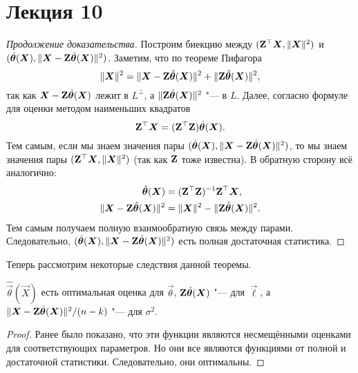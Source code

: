 
\section{Лекция 10}
\begin{proof}[Продолжение доказательства]
	Построим биекцию между $(\mathbf{Z}^{\top}\bm{X}, \|\bm{X}\|^{2})$ и $(\hat{\bm{\theta}}(\bm{X}), \|\bm{X} - \mathbf{Z}\hat{\bm{\theta}}(\bm{X})\|^{2})$. Заметим, что по теореме Пифагора
	\[
		\|\bm{X}\|^{2} = \|\bm{X} - \mathbf{Z}\hat{\bm{\theta}}(\bm{X})\|^{2} + \|\mathbf{Z}\hat{\bm{\theta}}(\bm{X})\|^{2},
	\]
	так как $\bm{X} - \mathbf{Z}\hat{\bm{\theta}}(\bm{X})$ лежит в $L^{\perp}$, а $\|\mathbf{Z}\hat{\bm{\theta}}(\bm{X})\|^{2}$ "--- в $L$. Далее, согласно формуле для оценки методом наименьших квадратов
	\[
		\mathbf{Z}^{\top}\bm{X} = (\mathbf{Z}^{\top}\mathbf{Z})\hat{\bm{\theta}}(\bm{X}).
	\]
	Тем самым, если мы знаем значения пары $(\hat{\bm{\theta}}(\bm{X}), \|\bm{X} - \mathbf{Z}\hat{\bm{\theta}}(\bm{X})\|^{2})$, то мы знаем значения пары $(\mathbf{Z}^{\top}\bm{X}, \|\bm{X}\|^{2})$ (так как $\mathbf{Z}$ тоже известна). В обратную сторону всё аналогично:
	\begin{align*}
		\hat{\bm{\theta}}(\bm{X}) 
		&= (\mathbf{Z}^{\top}\mathbf{Z})^{-1}\mathbf{Z}^{\top}\bm{X}, \\
		\|\bm{X} - \mathbf{Z}\hat{\bm{\theta}}(\bm{X})\|^{2}
		&= \|\bm{X}\|^{2} - \|\mathbf{Z}\hat{\bm{\theta}}(\bm{X})\|^{2}.
	\end{align*}
	Тем самым получаем полную взаимообратную связь между парами. Следовательно, $(\hat{\bm{\theta}}(\bm{X}), \|\bm{X} - \mathbf{Z}\hat{\bm{\theta}}(\bm{X})\|^{2})$ есть полная достаточная статистика.
\end{proof}

Теперь рассмотрим некоторые следствия данной теоремы.
\begin{consequence}
	$\hat{\vec{\theta}}(\vec{X})$ есть оптимальная оценка для $\vec{\theta}$, $\mathbf{Z}\hat{\bm{\theta}}(\bm{X})$ "--- для $\vec{\ell}$, а $\|\bm{X} - \mathbf{Z}\hat{\bm{\theta}}(\bm{X})\|^{2}/(n - k)$ "--- для $\sigma^{2}$.
\end{consequence}
\begin{proof}
	Ранее было показано, что эти функции являются несмещёнными оценками для соответствующих параметров. Но они все являются функциями от полной и достаточной статистики. Следовательно, они оптимальны.
\end{proof}

